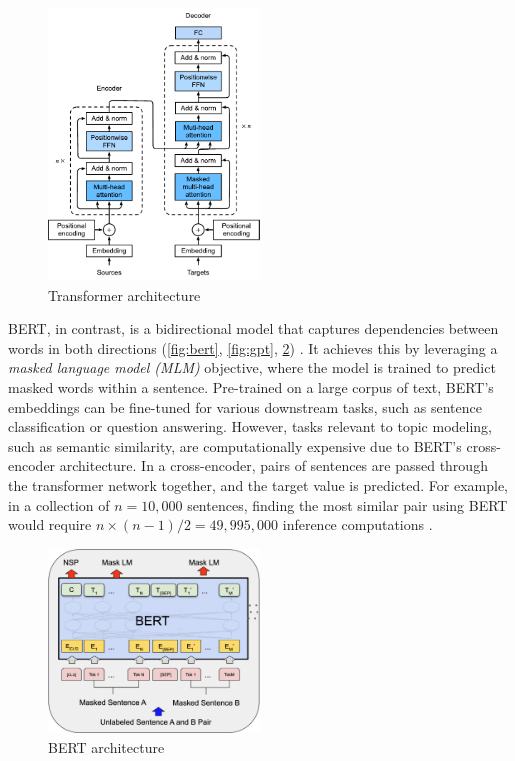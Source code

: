 \begin{figure}[h]
    \centering
    \includegraphics[width=0.5\textwidth]{figures/transformer.pdf}
    \caption{Transformer architecture}
    \label{fig:transformer}
\end{figure}

BERT, in contrast, is a bidirectional model that captures dependencies between words in both directions (\cref{fig:bert}, \cref{fig:gpt}, \cref{fig:bert_detailed}) \cite{vaswani_attention_2017, devlin_bert_2019}. It achieves this by leveraging a \textit{masked language model (MLM)} objective, where the model is trained to predict masked words within a sentence. Pre-trained on a large corpus of text, BERT’s embeddings can be fine-tuned for various downstream tasks, such as sentence classification or question answering. However, tasks relevant to topic modeling, such as semantic similarity, are computationally expensive due to BERT's cross-encoder architecture. In a cross-encoder, pairs of sentences are passed through the transformer network together, and the target value is predicted. For example, in a collection of \( n = 10,000 \) sentences, finding the most similar pair using BERT would require \( n \times (n-1) / 2 = 49,995,000 \) inference computations \cite{reimers_sentence-bert_2019}.

\begin{figure}[h]
    \centering
    \includegraphics[width=0.5\textwidth]{figures/bert_detailed.png}
    \caption{BERT architecture}
    \label{fig:bert_detailed}
\end{figure}

